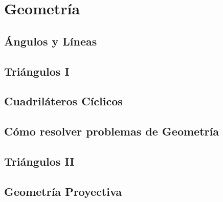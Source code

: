 
\chapter{Geometría}

    \section{Ángulos y Líneas}

    \section{Triángulos I}

    \section{Cuadriláteros Cíclicos}

    \section{Cómo resolver problemas de Geometría}

    \section{Triángulos II}

    \section{Geometría Proyectiva}
